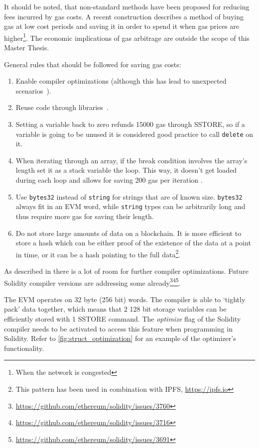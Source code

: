 It should be noted, that non-standard methods have been proposed for reducing fees incurred by gas costs. A recent construction \cite{gastoken} describes a method of buying gas at low cost periods and saving it in order to spend it when gas prices are higher\footnote{When the network is congested}. The economic implications of gas arbitrage are outside the scope of this Master Thesis. 

General rules that should be followed for saving gas costs:
\begin{enumerate}
    \item Enable compiler optimizations (although this has lead to unexpected scenarios~\cite{compiler}).
    \item Reuse code through libraries~\cite{library}.
    \item Setting a variable back to zero refunds 15000 gas through SSTORE, so if a variable is going to be unused it is considered good practice to call \texttt{delete} on it. 
    \item When iterating through an array, if the break condition involves the array's length set it as a stack variable the loop. This way, it doesn't get loaded during each loop and allows for saving 200 gas per iteration \cite{DBLP:journals/corr/ChenLLZ17}.
    \item Use \texttt{bytes32} instead of \texttt{string} for strings that are of known size. \texttt{bytes32} always fit in an EVM word, while \texttt{string} types can be arbitrarily long and thus require more gas for saving their length.
    \item Do not store large amounts of data on a blockchain. It is more efficient to store a hash which can be either proof of the existence of the data at a point in time, or it can be a hash pointing to the full data\footnote{This pattern has been used in combination with IPFS, \url{https://ipfs.io}}.
\end{enumerate}

As described in \cite{DBLP:journals/corr/ChenLLZ17} there is a lot of room for further compiler optimizations. Future Solidity compiler versions are addressing some already\footnote{\url{https://github.com/ethereum/solidity/issues/3760}}\footnote{\url{https://github.com/ethereum/solidity/issues/3716}}\footnote{\url{https://github.com/ethereum/solidity/issues/3691}}.

The EVM operates on 32 byte (256 bit) words. The compiler is able to `tightly pack' data together, which means that 2 128 bit storage variables can be efficiently stored with 1 SSTORE command. The \textit{optimize} flag of the Solidity compiler needs to be activated to access this feature when programming in Solidity. Refer to \ref{fig:struct_optimization} for an example of the optimizer's functionality.

